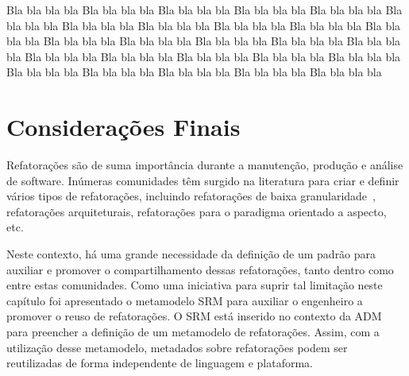 Bla bla bla bla Bla bla bla bla Bla bla bla bla Bla bla bla bla Bla bla bla bla Bla bla bla bla Bla bla bla bla Bla bla bla bla Bla bla bla bla Bla bla bla bla Bla bla bla bla Bla bla bla bla Bla bla bla bla Bla bla bla bla Bla bla bla bla Bla bla bla bla Bla bla bla bla Bla bla bla bla Bla bla bla bla Bla bla bla bla Bla bla bla bla Bla bla bla bla Bla bla bla bla Bla bla bla bla Bla bla bla bla Bla bla bla bla 

\section{Considerações Finais}
\label{sec:consideracoes_finais_SRM}

Refatorações são de suma importância durante a manutenção, produção e análise de software. Inúmeras comunidades têm surgido na literatura para criar e definir vários tipos de refatorações, incluindo refatorações de baixa granularidade~\cite{Fowler1999, Demeyer1, Demeyer2}, refatorações arquiteturais, refatorações para o paradigma orientado a aspecto, etc. 

Neste contexto, há uma grande necessidade da definição de um padrão para auxiliar e promover o compartilhamento dessas refatorações, tanto dentro como entre estas comunidades. Como uma iniciativa para suprir tal limitação neste capítulo foi apresentado o metamodelo SRM para auxiliar o engenheiro a promover o reuso de refatorações. O SRM está inserido no contexto da ADM para preencher a definição de um metamodelo de refatorações. Assim, com a utilização desse metamodelo, metadados sobre refatorações podem ser reutilizadas de forma independente de linguagem e plataforma.


